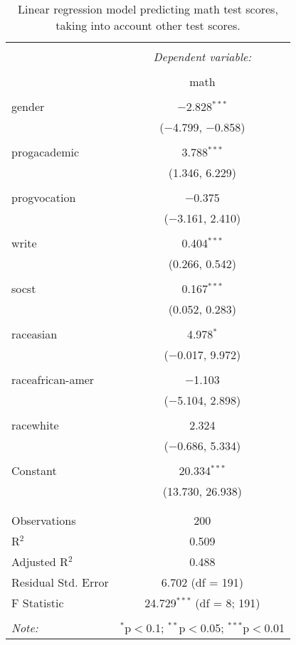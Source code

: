 
\begin{table}[!htbp] \centering 
  \caption{Linear regression model predicting math test scores, taking into 
          account other test scores.} 
  \label{tab::lm_math_peeking} 
\begin{tabular}{@{\extracolsep{5pt}}lc} 
\\[-1.8ex]\hline 
\hline \\[-1.8ex] 
 & \multicolumn{1}{c}{\textit{Dependent variable:}} \\ 
\cline{2-2} 
\\[-1.8ex] & math \\ 
\hline \\[-1.8ex] 
 gender & $-$2.828$^{***}$ \\ 
  & ($-$4.799, $-$0.858) \\ 
  & \\ 
 progacademic & 3.788$^{***}$ \\ 
  & (1.346, 6.229) \\ 
  & \\ 
 progvocation & $-$0.375 \\ 
  & ($-$3.161, 2.410) \\ 
  & \\ 
 write & 0.404$^{***}$ \\ 
  & (0.266, 0.542) \\ 
  & \\ 
 socst & 0.167$^{***}$ \\ 
  & (0.052, 0.283) \\ 
  & \\ 
 raceasian & 4.978$^{*}$ \\ 
  & ($-$0.017, 9.972) \\ 
  & \\ 
 raceafrican-amer & $-$1.103 \\ 
  & ($-$5.104, 2.898) \\ 
  & \\ 
 racewhite & 2.324 \\ 
  & ($-$0.686, 5.334) \\ 
  & \\ 
 Constant & 20.334$^{***}$ \\ 
  & (13.730, 26.938) \\ 
  & \\ 
\hline \\[-1.8ex] 
Observations & 200 \\ 
R$^{2}$ & 0.509 \\ 
Adjusted R$^{2}$ & 0.488 \\ 
Residual Std. Error & 6.702 (df = 191) \\ 
F Statistic & 24.729$^{***}$ (df = 8; 191) \\ 
\hline 
\hline \\[-1.8ex] 
\textit{Note:}  & \multicolumn{1}{r}{$^{*}$p$<$0.1; $^{**}$p$<$0.05; $^{***}$p$<$0.01} \\ 
\end{tabular} 
\end{table} 
